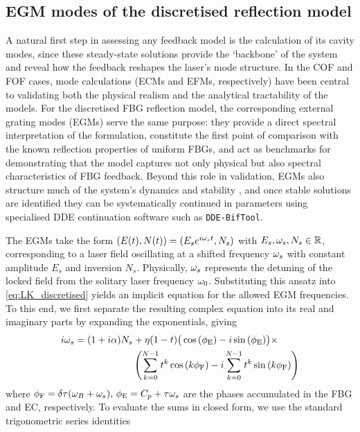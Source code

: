 \subsection{EGM modes of the discretised reflection model}
\label{subsec:EGM_discretised}
%
A natural first step in assessing any feedback model is the calculation of its cavity modes, since these steady-state solutions provide the `backbone' of the system and reveal how the feedback reshapes the laser’s mode structure.
In the COF and FOF cases, mode calculations (ECMs and EFMs, respectively) have been central to validating both the physical realism and the analytical tractability of the models.
For the discretised FBG reflection model, the corresponding external grating modes (EGMs) serve the same purpose: they provide a direct spectral interpretation of the formulation, constitute the first point of comparison with the known reflection properties of uniform FBGs, and act as benchmarks for demonstrating that the model captures not only physical but also spectral characteristics of FBG feedback.
Beyond this role in validation, EGMs also structure much of the system’s dynamics and stability \cite{rottschafer2007ecm}, and once stable solutions are identified they can be systematically continued in parameters using specialised DDE continuation software such as \texttt{DDE-BifTool}.
%
\par
%
The EGMs take the form $(E(t), N(t)) = (E_s e^{i\omega_s t}, N_s)$ with $E_s, \omega_s, N_s \in \mathbb{R}$, corresponding to a laser field oscillating at a shifted frequency $\omega_s$ with constant amplitude $E_s$ and inversion $N_s$.
Physically, $\omega_s$ represents the detuning of the locked field from the solitary laser frequency $\omega_0$.
Substituting this ansatz into \eqref{eq:LK_discretised} yields an implicit equation for the allowed EGM frequencies.
To this end, we first separate the resulting complex equation into its real and imaginary parts by expanding the exponentials, giving
%
\begin{align*}
    i \omega_s = (1+i \alpha) N_s &+ \eta (1-t) \big(\cos{(\phi_\text{E})} -i\sin{(\phi_\text{E})}  \big) \times \\ 
                        &\left( \sum_{k=0}^{N-1} t^k \cos{(k\phi_\text{F})} - i \sum_{k=0}^{N-1} t^k \sin{(k\phi_\text{F})} \right)
\end{align*}
%
where $\phi_\text{F} = \delta \tau(\omega_B + \omega_s), \, \phi_\text{E} = C_p+\tau \omega_s$ are the phases accumulated in the FBG and EC, respectively.
To evaluate the sums in closed form, we use the standard trigonometric series identities
